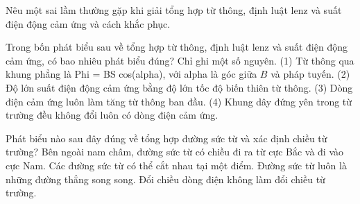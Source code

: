 \begin{bt}
Nêu một sai lầm thường gặp khi giải tổng hợp từ thông, định luật lenz và suất điện động cảm ứng và cách khắc phục.
\end{bt}

\begin{ex}
Trong bốn phát biểu sau về tổng hợp từ thông, định luật lenz và suất điện động cảm ứng, có bao nhiêu phát biểu đúng? Chỉ ghi một số nguyên. (1) Từ thông qua khung phẳng là Phi = BS cos(alpha), với alpha là góc giữa $B$ và pháp tuyến. (2) Độ lớn suất điện động cảm ứng bằng độ lớn tốc độ biến thiên từ thông. (3) Dòng điện cảm ứng luôn làm tăng từ thông ban đầu. (4) Khung dây đứng yên trong từ trường đều không đổi luôn có dòng điện cảm ứng.
\end{ex}

\begin{ex}
Phát biểu nào sau đây đúng về tổng hợp đường sức từ và xác định chiều từ trường?
\choice
{\True Bên ngoài nam châm, đường sức từ có chiều đi ra từ cực Bắc và đi vào cực Nam.}
{Các đường sức từ có thể cắt nhau tại một điểm.}
{Đường sức từ luôn là những đường thẳng song song.}
{Đổi chiều dòng điện không làm đổi chiều từ trường.}
\end{ex}

